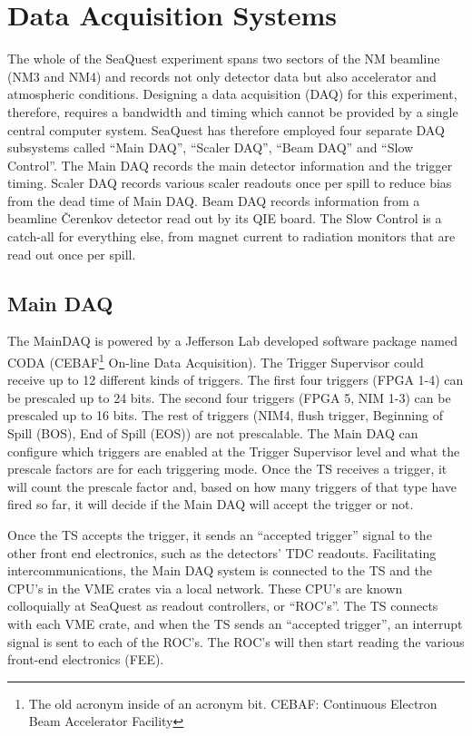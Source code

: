\section{Data Acquisition Systems}

The whole of the SeaQuest experiment spans two sectors of the NM beamline (NM3 and NM4) and records not only detector data but also accelerator and atmospheric conditions. Designing a data acquisition (DAQ) for this experiment, therefore, requires a bandwidth and timing which cannot be provided by a single central computer system. SeaQuest has therefore employed four separate DAQ subsystems called ``Main DAQ'', ``Scaler DAQ'', ``Beam DAQ'' and ``Slow Control''. The Main DAQ records the main detector information and the trigger timing. Scaler DAQ records various scaler readouts once per spill to reduce bias from the dead time of Main DAQ. Beam DAQ records information from a beamline \v{C}erenkov detector read out by its QIE board. The Slow Control is a catch-all for everything else, from magnet current to radiation monitors that are read out once per spill.

\subsection{Main DAQ}

The MainDAQ is powered by a Jefferson Lab developed software package named CODA (CEBAF\footnote{The old acronym inside of an acronym bit. CEBAF: Continuous Electron Beam Accelerator Facility} On-line Data Acquisition). The Trigger Supervisor could receive up to 12 different kinds of triggers. The first four triggers (FPGA 1-4) can be prescaled up to 24 bits. The second four triggers (FPGA 5, NIM 1-3) can be prescaled up to 16 bits. The rest of triggers (NIM4, flush trigger, Beginning of Spill (BOS), End of Spill (EOS)) are not prescalable. The Main DAQ can configure which triggers are enabled at the Trigger Supervisor level and what the  prescale factors are for each triggering mode. Once the TS receives a trigger, it will count the prescale factor and, based on how many triggers of that type have fired so far, it will decide if the Main DAQ will accept the trigger or not. 

Once the TS accepts the trigger, it sends an ``accepted trigger'' signal to the other front end electronics, such as the detectors' TDC readouts. Facilitating intercommunications, the Main DAQ system is connected to the TS and the CPU's in the VME crates via a local network. These CPU's are known colloquially at SeaQuest as readout controllers, or ``ROC's''. The TS connects with each VME crate, and when the TS sends an ``accepted trigger'', an interrupt signal is sent to each of the ROC's. The ROC's will then start reading the various front-end electronics (FEE).

